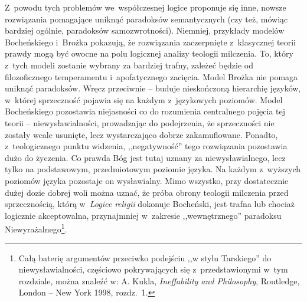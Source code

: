 Z~powodu tych problemów we~współczesnej logice proponuje się inne, nowsze rozwiązania pomagające uniknąć paradoksów semantycznych (czy też, mówiąc bardziej ogólnie, paradoksów samozwrotności). Niemniej, przykłady modelów Bocheńskiego i~Brożka pokazują, że rozwiązania zaczerpnięte z~klasycznej teorii prawdy mogą być owocne na polu logicznej analizy teologii milczenia. To, który z~tych modeli zostanie wybrany za bardziej trafny, zależeć będzie od filozoficznego temperamentu i~apofatycznego zacięcia. Model Brożka nie pomaga uniknąć paradoksów. Wręcz przeciwnie -- buduje nieskończoną hierarchię języków, w~której sprzeczność pojawia się na każdym z~językowych poziomów. Model Bocheńskiego pozostawia niejasności co do rozumienia centralnego pojęcia tej teorii -- niewysławialności, prowadzając do podejrzenia, że sprzeczności nie zostały wcale usunięte, lecz wystarczająco dobrze zakamuflowane. Ponadto, z~teologicznego punktu widzenia, ,,negatywność'' tego rozwiązania pozostawia dużo do życzenia. Co prawda Bóg jest tutaj uznany za niewysławialnego, lecz tylko na podstawowym, przedmiotowym poziomie języka. Na każdym z~wyższych poziomów języka pozostaje on wysławialny. Mimo wszystko, przy dostatecznie dużej dozie dobrej woli można uznać, że próba obrony teologii milczenia przed sprzecznością, którą w~\textit{Logice religii} dokonuje Bocheński, jest trafna lub chociaż logicznie akceptowalna, przynajmniej w~zakresie ,,wewnętrznego'' paradoksu Niewyrażalnego\footnote{Całą baterię argumentów przeciwko podejściu ,,w stylu Tarskiego'' do niewysławialności, częściowo pokrywających się z~przedstawionymi w~tym rozdziale, można znaleźć w: A. Kukla, \textit{Ineffability and Philosophy}, Routledge, London -- New York 1998, rozdz.~1.}.

